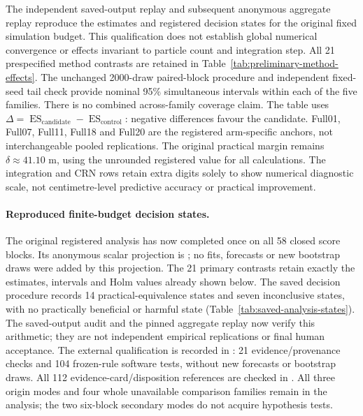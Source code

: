 \documentclass[11pt]{article}
\newcommand{\ES}{\operatorname{ES}}
\begin{document}
The independent saved-output replay and subsequent anonymous aggregate replay
reproduce the estimates and registered decision states for the original fixed
simulation budget. This qualification does not establish global numerical
convergence or effects invariant to particle count and integration step.
All 21 prespecified
method contrasts are retained in Table~\ref{tab:preliminary-method-effects}.
The unchanged 2000-draw paired-block procedure and independent fixed-seed
tail check provide nominal 95\% simultaneous intervals within each of the
five families. There is no combined across-family coverage claim.
The table uses $\Delta=\ES_{\mathrm{candidate}}-\ES_{\mathrm{control}}$:
negative differences favour the candidate. Full01, Full07, Full11, Full18 and
Full20 are the registered arm-specific anchors, not interchangeable pooled
replications. The original practical margin remains $\delta\approx41.10$ m,
using the unrounded registered value for all calculations. The integration
and CRN rows retain extra digits solely to show numerical diagnostic scale,
not centimetre-level predictive accuracy or practical improvement.

\paragraph{Reproduced finite-budget decision states.}
\label{sec:saved-analysis-status}
The original registered analysis has now completed once on all 58 closed
score blocks. Its anonymous scalar projection is
; no fits, forecasts or
new bootstrap draws were added by this projection. The 21 primary contrasts
retain exactly the estimates, intervals and Holm values already shown below.
The saved decision procedure records 14 practical-equivalence states and
seven inconclusive states, with no practically beneficial or harmful state
(Table~\ref{tab:saved-analysis-states}). The saved-output audit and the pinned
aggregate replay now verify this arithmetic; they are not independent empirical
replications or final human acceptance. The external qualification is recorded
in : 21 evidence/provenance
checks and 104 frozen-rule software tests, without new forecasts or bootstrap
draws. All 112 evidence-card/disposition references are checked in
. All three origin
modes and four whole unavailable comparison families remain in the analysis;
the two six-block secondary modes do not acquire hypothesis tests.
\end{document}
